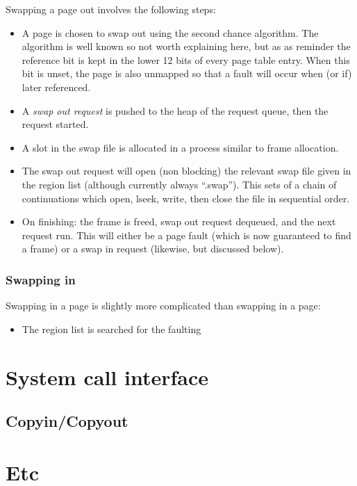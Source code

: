 \documentclass[12pt,english]{article}
\begin{document}
Swapping a page out involves the following steps:
\begin{itemize}
\item A page is chosen to swap out using the second chance algorithm.  The algorithm is well known so not worth explaining here, but as as reminder the reference bit is kept in the lower 12 bits of every page table entry.  When this bit is unset, the page is also unmapped so that a fault will occur when (or if) later referenced.
\item A \emph{swap out request} is pushed to the heap of the request queue, then the request started.
\item A slot in the swap file is allocated in a process similar to frame allocation.
\item The swap out request will open (non blocking) the relevant swap file given in the region list (although currently always ``.swap'').  This sets of a chain of continuations which open, lseek, write, then close the file in sequential order.
\item On finishing: the frame is freed, swap out request dequeued, and the next request run.  This will either be a page fault (which is now guaranteed to find a frame) or a swap in request (likewise, but discussed below).
\end{itemize}

\subsubsection{Swapping in}

Swapping in a page is slightly more complicated than swapping in a page:
\begin{itemize}
\item The region list is searched for the faulting 
\end{itemize}


\section{System call interface}

\subsection{Copyin/Copyout}


\newpage{}
\section{Etc}
\end{document}
